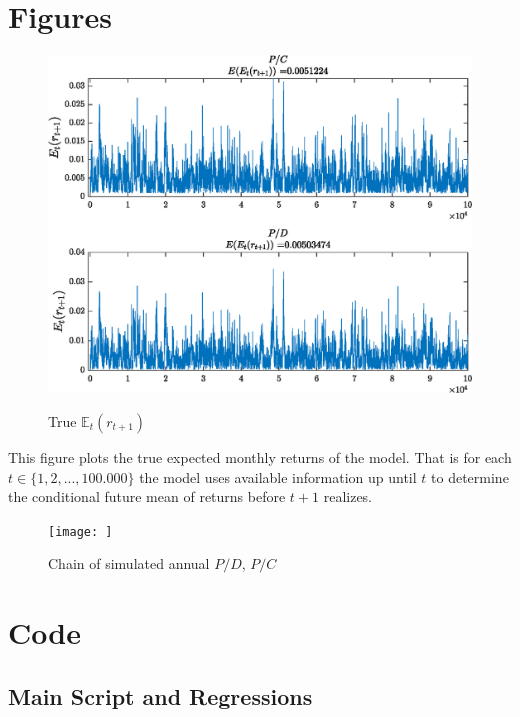 \section{Figures}

\begin{figure}[H]
    \centering
    \caption{True $\mathbb{E}_t\left(r_{t+1}\right)$}
    \includegraphics{Figures/Excess_Rets.eps}
    \label{fig:ExpExRets}
\end{figure}
This figure plots the true expected monthly returns of the model. That is for each $t\in\{1,2,...,100.000\}$ the model uses available information up until $t$ to determine the conditional future mean of returns before $t+1$ realizes. 

\begin{figure}
    \centering
    \texttt{[image: ]}
    \caption{Chain of simulated annual $P/D$, $P/C$}
    \label{fig:PCPD}
\end{figure}


\section{Code}
\subsection{Main Script and Regressions}
\label{sec:app1}




